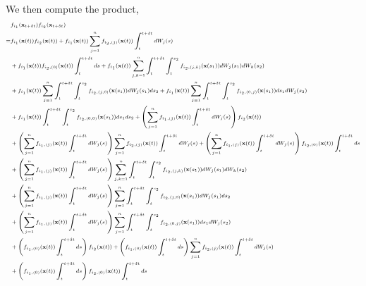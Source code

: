 %
We then compute the product,
%
\begin{equation}
\scriptsize
\begin{aligned}
&f_{i_1}(\mathbf{x}_{t + \delta t}) f_{i_2}(\mathbf{x}_{t + \delta t}) \\
=& 
f_{i_1}(\mathbf{x}(t)) f_{i_2}(\mathbf{x}(t)) 
+  f_{i_1}(\mathbf{x}(t)) \sum_{j=1}^n f_{{i_2},(j)}(\mathbf{x}(t)) \int_t^{t + \delta t} dW_j(s) \\
&+  f_{i_1}(\mathbf{x}(t)) f_{{i_2},(0)}(\mathbf{x}(t)) \int_t^{t + \delta t} ds
+ f_{i_1}(\mathbf{x}(t)) \sum_{j, k=1}^n \int_t^{t+\delta t} \int_t^{s_2} f_{{i_2}, (j,k)}(\mathbf{x}(s_1)) dW_j(s_1) dW_k(s_2) \\
&+ f_{i_1}(\mathbf{x}(t)) \sum_{j=1}^n \int_t^{t+\delta t} \int_t^{s_2} f_{{i_2}, (j,0)}(\mathbf{x}(s_1)) dW_j(s_1) ds_2 
+ f_{i_1}(\mathbf{x}(t)) \sum_{j=1}^n \int_t^{t+\delta t} \int_t^{s_2} f_{{i_2}, (0,j)}(\mathbf{x}(s_1)) ds_1 dW_j(s_2) \\
&+ f_{i_1}(\mathbf{x}(t)) \int_t^{t+\delta t} \int_t^{s_2} f_{{i_2}, (0,0)}(\mathbf{x}(s_1)) ds_1 ds_2 
+ \left( \sum_{j=1}^n f_{{i_1},(j)}(\mathbf{x}(t)) \int_t^{t + \delta t} dW_j(s) \right) f_{i_2}(\mathbf{x}(t)) \\
&+ \left( \sum_{j=1}^n f_{{i_1},(j)}(\mathbf{x}(t)) \int_t^{t + \delta t} dW_j(s) \right) \sum_{j=1}^n f_{{i_2},(j)}(\mathbf{x}(t)) \int_t^{t + \delta t} dW_j(s) 
+  \left(\sum_{j=1}^n f_{{i_1},(j)}(\mathbf{x}(t)) \int_t^{t + \delta t} dW_j(s) \right)f_{{i_2},(0)}(\mathbf{x}(t)) \int_t^{t + \delta t} ds \\
&+ \left(\sum_{j=1}^n f_{{i_1},(j)}(\mathbf{x}(t)) \int_t^{t + \delta t} dW_j(s) \right) \sum_{j, k=1}^n \int_t^{t+\delta t} \int_t^{s_2} f_{{i_2},(j,k)}(\mathbf{x}(s_1)) dW_j(s_1) dW_k(s_2) \\
&+ \left(\sum_{j=1}^n f_{{i_1},(j)}(\mathbf{x}(t)) \int_t^{t + \delta t} dW_j(s) \right)\sum_{j=1}^n \int_t^{t+\delta t} \int_t^{s_2} f_{{i_2},(j,0)}(\mathbf{x}(s_1)) dW_j(s_1) ds_2 \\
&+ \left(\sum_{j=1}^n f_{{i_1},(j)}(\mathbf{x}(t)) \int_t^{t + \delta t} dW_j(s) \right)\sum_{j=1}^n \int_t^{t+\delta t} \int_t^{s_2} f_{{i_2},(0,j)}(\mathbf{x}(s_1)) ds_1 dW_j(s_2) \\
&+\left( f_{{i_1},(0)}(\mathbf{x}(t)) \int_t^{t + \delta t} ds \right) f_{i_2}(\mathbf{x}(t)) 
+  \left( f_{{i_1},(0)}(\mathbf{x}(t)) \int_t^{t + \delta t} ds \right)\sum_{j=1}^n f_{{i_2},(j)}(\mathbf{x}(t)) \int_t^{t + \delta t} dW_j(s) \\
&+  \left( f_{{i_1},(0)}(\mathbf{x}(t)) \int_t^{t + \delta t} ds \right)f_{{i_2},(0)}(\mathbf{x}(t)) \int_t^{t + \delta t} ds

\end{aligned}
\end{equation}
